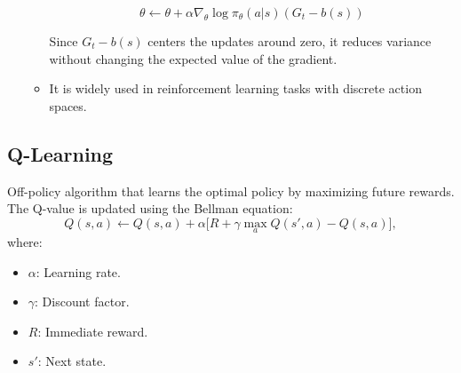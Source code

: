 \documentclass[12pt,a4paper]{article}
\begin{document}
\begin{enumerate}
\begin{itemize}
\[
\theta \leftarrow \theta + \alpha \nabla_{\theta} \log \pi_{\theta}(a | s) (G_t - b(s))
\]

Since \( G_t - b(s) \) centers the updates around zero, it reduces variance without changing the expected value of the gradient.

        \item It is widely used in reinforcement learning tasks with discrete action spaces.
    \end{itemize}
\end{enumerate}
\subsection{Q-Learning} Off-policy algorithm that learns the optimal policy by maximizing future rewards. The Q-value is updated using the Bellman equation:
        \[
        Q(s, a) \gets Q(s, a) + \alpha \big[ R + \gamma \max_a Q(s', a) - Q(s, a) \big],
        \]
        where:
        \begin{itemize}
            \item \( \alpha \): Learning rate.
            \item \( \gamma \): Discount factor.
            \item \( R \): Immediate reward.
            \item \( s' \): Next state.
        \end{itemize}
\end{document}
